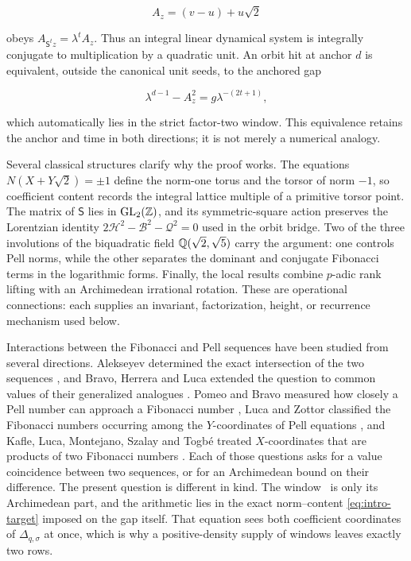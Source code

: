 \begin{equation}
 A_z=(v-u)+u\sqrt2
 \label{eq:intro-seed-map}
\end{equation}

obeys $A_{\mathsf S^tz}=\lambda^tA_z$. Thus an integral linear dynamical
system is integrally conjugate to multiplication by a quadratic unit. An orbit hit
at anchor $d$ is equivalent, outside the canonical unit seeds, to the
anchored gap

\begin{equation}
 \lambda^{d-1}-A_z^2=g\lambda^{-(2t+1)},
 \label{eq:intro-anchored-gap}
\end{equation}

which automatically lies in the strict factor-two window. This equivalence
retains the anchor and time in both directions; it is not merely a numerical
analogy.

Several classical structures clarify why the proof works. The equations
$N(X+Y\sqrt2)=\pm1$ define the norm-one torus and the torsor of norm $-1$, so
coefficient content records the integral lattice multiple of a primitive
torsor point. The matrix of $\mathsf S$ lies in $\mathrm{GL}_2(\mathbb{Z})$, and
its symmetric-square action preserves the Lorentzian identity
$2\mathcal H^2-\mathcal B^2-\mathcal Q^2=0$ used in the orbit bridge.
Two of the three involutions of the biquadratic field $\mathbb{Q}(\sqrt2,\sqrt5)$
carry the argument: one controls Pell norms, while the other separates the
dominant and conjugate Fibonacci terms in the logarithmic forms. Finally,
the local results combine $p$-adic rank lifting with an Archimedean irrational
rotation. These are operational connections: each supplies an invariant,
factorization, height, or recurrence mechanism used below.

Interactions between the Fibonacci and Pell sequences have been studied from
several directions. Alekseyev determined the exact intersection of the two
sequences \cite{Alekseyev2011}, and Bravo, Herrera and Luca extended the
question to common values of their generalized analogues
\cite{BravoHerreraLuca2021}. Pomeo and Bravo measured how closely a Pell
number can approach a Fibonacci number \cite{PomeoBravo2024}, Luca and Zottor
classified the Fibonacci numbers occurring among the $Y$-coordinates of Pell
equations \cite{LucaZottor2023}, and Kafle, Luca, Montejano, Szalay and
Togb\'e treated $X$-coordinates that are products of two Fibonacci numbers
\cite{KafleEtAl2019}. Each of those questions asks for a value coincidence
between two sequences, or for an Archimedean bound on their difference. The
present question is different in kind. The
window~ is only its Archimedean part, and the arithmetic lies
in the exact norm--content \cref{eq:intro-target} imposed on the gap
itself. That equation sees both coefficient coordinates of
$\Delta_{q,\sigma}$ at once, which is why a positive-density supply of
windows leaves exactly two rows.


